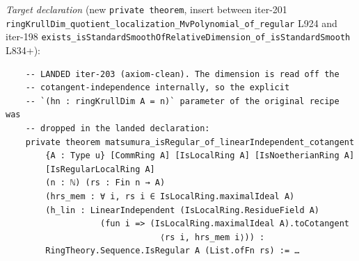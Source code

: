 \begin{itemize}
    \emph{Target declaration} (new \texttt{private theorem}, insert
    between iter-201 \texttt{ringKrullDim\_quotient\_localization\_MvPolynomial\_of\_regular}
    L924 and iter-198 \texttt{exists\_isStandardSmoothOfRelativeDimension\_of\_isStandardSmooth}
    L834+):
    \begin{verbatim}
    -- LANDED iter-203 (axiom-clean). The dimension is read off the
    -- cotangent-independence internally, so the explicit
    -- `(hn : ringKrullDim A = n)` parameter of the original recipe was
    -- dropped in the landed declaration:
    private theorem matsumura_isRegular_of_linearIndependent_cotangent
        {A : Type u} [CommRing A] [IsLocalRing A] [IsNoetherianRing A]
        [IsRegularLocalRing A]
        (n : ℕ) (rs : Fin n → A)
        (hrs_mem : ∀ i, rs i ∈ IsLocalRing.maximalIdeal A)
        (h_lin : LinearIndependent (IsLocalRing.ResidueField A)
                   (fun i => (IsLocalRing.maximalIdeal A).toCotangent
                               ⟨rs i, hrs_mem i⟩)) :
        RingTheory.Sequence.IsRegular A (List.ofFn rs) := …
    \end{verbatim}


\end{itemize}
